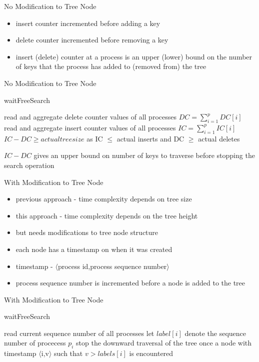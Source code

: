 \begin{frame}[c]{No Modification to Tree Node}
\begin{itemize}
\item insert counter incremented before adding a key
\item delete counter incremented before removing a key
\item insert (delete) counter at a process is an upper (lower) bound on the number of keys that the process has added to (removed from) the tree
\end{itemize}
\end{frame}

\begin{frame}[c]{No Modification to Tree Node}
\renewcommand{\thealgocf}{}
\begin{algorithm}[H]
\caption{\tiny waitFreeSearch}
read and aggregate delete counter values of all processes $DC = \sum\limits_{i=1}^p DC[i]$\;
read and aggregate insert counter values of all processes $IC = \sum\limits_{i=1}^p IC[i]$\;
$IC-DC \geq actual tree size$ as IC $\leq$ actual inserts and DC $\geq$ actual deletes\;
\end{algorithm}
$IC-DC$ gives an upper bound on number of keys to traverse before stopping the search operation
\end{frame}

\begin{frame}[c]{With Modification to Tree Node}
\begin{itemize}
\item  previous approach - time complexity depends on tree size
\item this approach - time complexity depends on the tree height
\item but needs modifications to tree node structure
\item each node has a timestamp on when it was created 
\item timestamp - $\langle$process id,process sequence number$\rangle$
\item process sequence number is incremented before a node is added to the tree
\end{itemize}
\end{frame}

\begin{frame}[c]{With Modification to Tree Node}
\renewcommand{\thealgocf}{}
\begin{algorithm}[H]
\caption{\tiny waitFreeSearch}
read current sequence number of all processes\;
let $label[i]$ denote the sequence number of procecess $p_i$\;
stop the downward traversal of the tree once a node with timestamp $\langle$i,v$\rangle$ such that $v > labels[i]$ is encountered\;
\end{algorithm}
\end{frame}